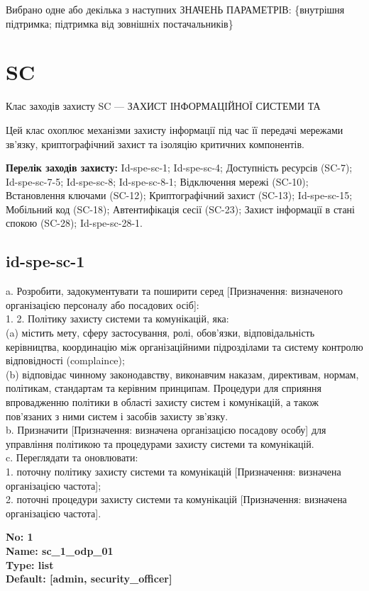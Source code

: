 \documentclass{article}
\begin{document}
{\footnotesize Вибрано одне або декілька з наступних ЗНАЧЕНЬ ПАРАМЕТРІВ: \{внутрішня підтримка; підтримка від зовнішніх постачальників\}}




\section{SC}
Клас заходів захисту SC --- ЗАХИСТ ІНФОРМАЦІЙНОЇ СИСТЕМИ ТА

Цей клас охоплює механізми захисту інформації під час її передачі мережами зв'язку, криптографічний захист та ізоляцію критичних компонентів.

\textbf{Перелік заходів захисту:} Id-spe-sc-1; Id-spe-sc-4; Доступність ресурсів (SC-7); Id-spe-sc-7-5; Id-spe-sc-8; Id-spe-sc-8-1; Відключення мережі (SC-10); Встановлення ключами (SC-12); Криптографічний захист (SC-13); Id-spe-sc-15; Мобільний код (SC-18); Автентифікація сесії (SC-23); Захист інформації в стані спокою (SC-28); Id-spe-sc-28-1.

\subsection{id-spe-sc-1}
a. Розробити, задокументувати та поширити серед [Призначення: визначеного організацією персоналу або посадових осіб]:\\ 
1. 2. Політику захисту системи та комунікацій, яка:\\ 
(a) містить мету, сферу застосування, ролі, обов'язки, відповідальність керівництва, координацію між організаційними підрозділами та систему контролю відповідності (complaince);\\ 
(b) відповідає чинному законодавству, виконавчим наказам, директивам, нормам, політикам, стандартам та керівним принципам. Процедури для сприяння впровадженню політики в області захисту систем і комунікацій, а також пов'язаних з ними систем і засобів захисту зв'язку.\\ 
b. Призначити [Призначення: визначена організацією посадову особу] для управління політикою та процедурами захисту системи та комунікацій.\\ 
c. Переглядати та оновлювати:\\ 
1. поточну політику захисту системи та комунікацій [Призначення: визначена організацією частота];\\ 
2. поточні процедури захисту системи та комунікацій [Призначення: визначена організацією частота].

\vspace{10pt}
{\footnotesize\bfseries
No: 1\\
Name: sc\_\allowbreak{}1\_\allowbreak{}odp\_\allowbreak{}01\\
Type: list\\
Default: [\textquotedbl{}admin\textquotedbl{}, \textquotedbl{}security\_\allowbreak{}officer\textquotedbl{}]
}
\end{document}
